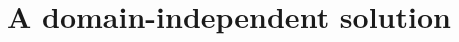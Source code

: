 \documentclass[../main.tex]{subfiles}
\begin{document}
\chapter{A domain-independent solution} %

\label{Chapter4} %











\end{document}

